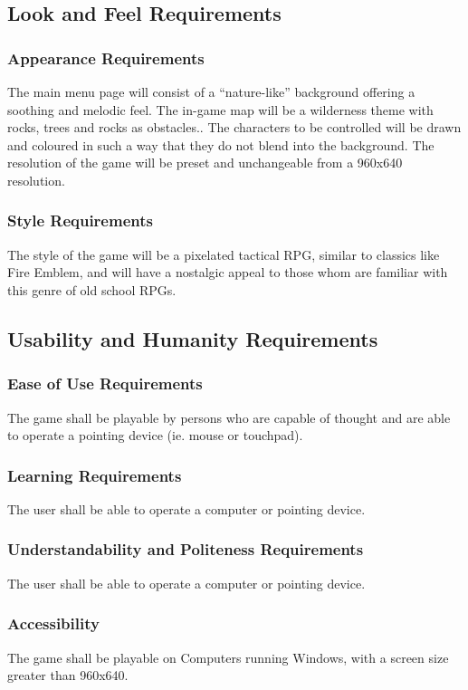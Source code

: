 \documentclass{article}
\begin{document}
\subsection{Look and Feel Requirements}

\subsubsection{Appearance Requirements}
 The main menu page will consist of a ``nature-like'' background offering a soothing and melodic feel. The in-game map will be a wilderness theme with rocks, trees and rocks as obstacles.. The characters to be controlled will be drawn and coloured in such a way that they do not blend into the background. The resolution of the game will be preset and unchangeable from a 960x640 resolution.

\subsubsection{Style Requirements}
The style of the game will be a pixelated tactical RPG, similar to classics like Fire Emblem, and will have a nostalgic appeal to those whom are familiar with this genre of old school RPGs.

\subsection{Usability and Humanity Requirements}

\subsubsection{Ease of Use Requirements}
The game shall be playable by persons who are capable of thought and are able to operate a pointing device (ie. mouse or touchpad).

\subsubsection{Learning Requirements}
The user shall be able to operate a computer or pointing device.

\subsubsection{Understandability and Politeness Requirements}
The user shall be able to operate a computer or pointing device.

\subsubsection{Accessibility}
The game shall be playable on Computers running Windows, with a screen size greater than 960x640.
\end{document}
